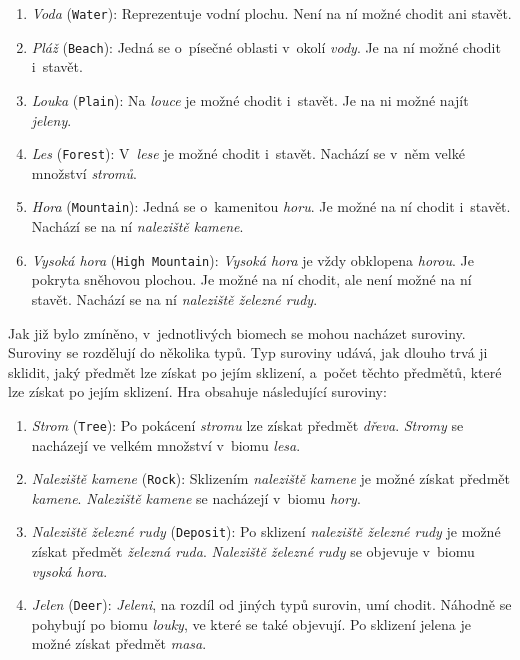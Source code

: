 \begin{enumerate}
    \item \textit{Voda} (\verb|Water|): Reprezentuje vodní plochu. Není na ní možné chodit ani stavět.
    \item \textit{Pláž} (\verb|Beach|): Jedná se o~písečné oblasti v~okolí \textit{vody}. Je na ní možné chodit i~stavět.
    \item \textit{Louka} (\verb|Plain|): Na \textit{louce} je možné chodit i~stavět. Je na ni možné najít \textit{jeleny}.
    \item \textit{Les} (\verb|Forest|): V~\textit{lese} je možné chodit i~stavět. Nachází se v~něm velké množství \textit{stromů}.
    \item \textit{Hora} (\verb|Mountain|): Jedná se o~kamenitou \textit{horu}. Je možné na ní chodit i~stavět. Nachází se na ní \textit{naleziště kamene}.
    \item \textit{Vysoká hora} (\verb|High Mountain|): \textit{Vysoká hora} je vždy obklopena \textit{horou}. Je pokryta sněhovou plochou. Je možné na ní chodit, ale není možné na ní stavět. Nachází se na ní \textit{naleziště železné rudy}.
\end{enumerate}

Jak již bylo zmíněno, v~jednotlivých biomech se mohou nacházet suroviny. Suroviny se rozdělují do několika typů. Typ suroviny udává, jak dlouho trvá ji sklidit, jaký předmět lze získat po jejím sklizení, a~počet těchto předmětů, které lze získat po jejím sklizení. Hra obsahuje následující suroviny:

\begin{enumerate}
    \item \textit{Strom} (\verb|Tree|): Po pokácení \textit{stromu} lze získat předmět \textit{dřeva}. \textit{Stromy} se nacházejí ve velkém množství v~biomu \textit{lesa}.
    \item \textit{Naleziště kamene} (\verb|Rock|): Sklizením \textit{naleziště kamene} je možné získat předmět \textit{kamene}. \textit{Naleziště kamene} se nacházejí v~biomu \textit{hory}.
    \item \textit{Naleziště železné rudy} (\verb|Deposit|): Po sklizení \textit{naleziště železné rudy} je možné získat předmět \textit{železná ruda}. \textit{Naleziště železné rudy} se objevuje v~biomu \textit{vysoká hora}.
    \item \textit{Jelen} (\verb|Deer|): \textit{Jeleni}, na rozdíl od jiných typů surovin, umí chodit. Náhodně se pohybují po biomu \textit{louky}, ve které se také objevují. Po sklizení jelena je možné získat předmět \textit{masa}.
\end{enumerate}

